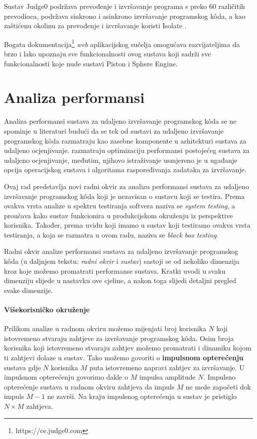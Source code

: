 \documentclass[times, utf8, diplomski]{fer}
\begin{document}
Sustav Judge0 podržava prevođenje i izvršavanje programa s preko 60 različitih prevodioca, podržava sinkrono i asinkrono izvršavanje programskog kôda, a kao zaštićenu okolinu za prevođenje i izvršavanje koristi Isolate \citep{marevs2012new}.

Bogata dokumentacija\footnote{https://ce.judge0.com} \textit{web} aplikacijskog sučelja omogućava razvijateljima da brzo i lako upoznaju sve funkcionalnosti ovog sustava koji sadrži sve funkcionalnosti koje nude sustavi Piston i Sphere Engine.

\chapter{Analiza performansi}
Analiza performansi sustava za udaljeno izvršavanje programskog kôda se ne spominje u literaturi budući da se tek od \citep{9245310} sustavi za udaljeno izvršavanje programskog kôda razmatraju kao zasebne komponente u arhitekturi sustava za udaljeno ocjenjivanje.
\citep{drung2011enhance} razmatraju optimizaciju performansi postojećeg sustava za udaljeno ocjenjivanje, međutim, njihovo istraživanje usmjereno je u ugađanje opcija operacijskog sustava i algoritama raspoređivanja zadataka za izvršavanje.

Ovaj rad predstavlja novi radni okvir za analizu performansi sustava za udaljeno izvršavanje programskog kôda koji je nezavisan o sustavu koji se testira. Prema \citep{nidhra2012black} ovakva vrsta analize u spektru testiranja softvera naziva se \textit{system testing}, a proučava kako sustav funkcionira u produkcijskom okruženju iz perspektive korisnika. Također, prema uvidu koji imamo u sustav koji testiramo ovakva vrsta testiranja, a koja se razmatra u ovom radu, naziva se \textit{black box testing}.

Radni okvir analize performansi sustava za udaljeno izvršavanje programskog kôda (u daljnjem tekstu: \textit{radni okvir} i \textit{sustav}) sastoji se od nekoliko dimenzija kroz koje možemo promatrati performanse sustava. Kratki uvodi u svaku dimenziju slijede u nastavku ove cjeline, a nakon toga slijedi detaljni pregled svake dimenzije.

\subsubsection{Višekorisničko okruženje}
Prilikom analize u radnom okviru možemo mijenjati broj korisnika $N$ koji istovremeno stvaraju zahtjeve za izvršavanje programskog kôda. Osim broja korisnika koji istovremeno stvaraju zahtjev možemo promatrati i dinamiku kojom ti zahtjevi dolaze u sustav. Tako možemo govoriti o \textbf{impulsnom opterećenju} sustava gdje $N$ korisnika $M$ puta istovremeno napravi zahtjev za izvršavanje. U impulsnom opterećenju govorimo dakle o $M$ impulsa amplitude $N$. Impulsno opterećenje sustava u radnom okviru zahtjeva da impuls $M$ ne može započeti dok impuls $M-1$ ne završi. Na kraju impulsnog opterećenja u sustav je pristiglo $N \times M$ zahtjeva.
\end{document}
